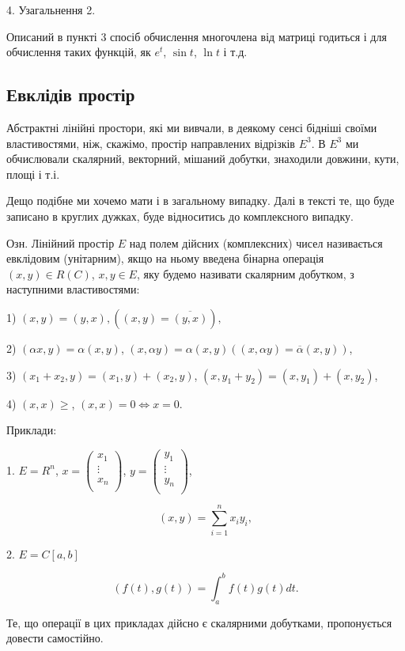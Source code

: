 4. Узагальнення 2.

Описаний в пункті 3 спосіб обчислення многочлена від матриці годиться і
для обчислення таких функцій, як $e^t$, $\sin t$, $\ln t$ і т.д. 

\subsection{Евклідів простір}

Абстрактні лінійні простори, які ми вивчали, в деякому сенсі бідніші
своїми властивостями, ніж, скажімо, простір направлених відрізків $E^3$. В $E^3$
ми обчислювали скалярний, векторний, мішаний добутки, знаходили
довжини, кути, площі і т.і. 

Дещо подібне ми хочемо мати і в загальному випадку. Далі в тексті те,
що буде записано в круглих дужках, буде відноситись до комплексного
випадку.

Озн. Лінійний простір $E$ над полем дійсних (комплексних) чисел
називається евклідовим (унітарним), якщо на ньому введена бінарна операція
$(x,y) \in R (C)$, $x,y \in E$, яку будемо називати скалярним добутком, з
наступними властивостями:

1) $(x,y) = (y,x), ((x,y) = \overline{(y,x)}),$

2) $(\alpha x, y) = \alpha(x, y)$, $(x, \alpha y) = \alpha(x, y) ((x, \alpha y) = \overline{\alpha}(x, y))$,

3) $(x_1 + x_2, y) = (x_1, y) + (x_2, y)$, $(x, y_1 + y_2) = (x, y_1) + (x, y_2)$,

4) $(x, x) \geqslant$, $(x,x) = 0 \Leftrightarrow x = 0$.

Приклади:

1. $E = R^n$, $x = \begin{pmatrix}
	x_1 \\
	\vdots \\
	x_n \\
\end{pmatrix}$, $y = \begin{pmatrix}
	y_1 \\
	\vdots \\
	y_n \\
\end{pmatrix}$,

$$(x,y) = \sum\limits_{i=1}^n x_i y_i,$$

2. $E = C[a,b]$

$$(f(t),g(t)) = \int_a^b f(t) g(t) dt.$$

Те, що операції в цих прикладах дійсно є скалярними добутками,
пропонується довести самостійно.

